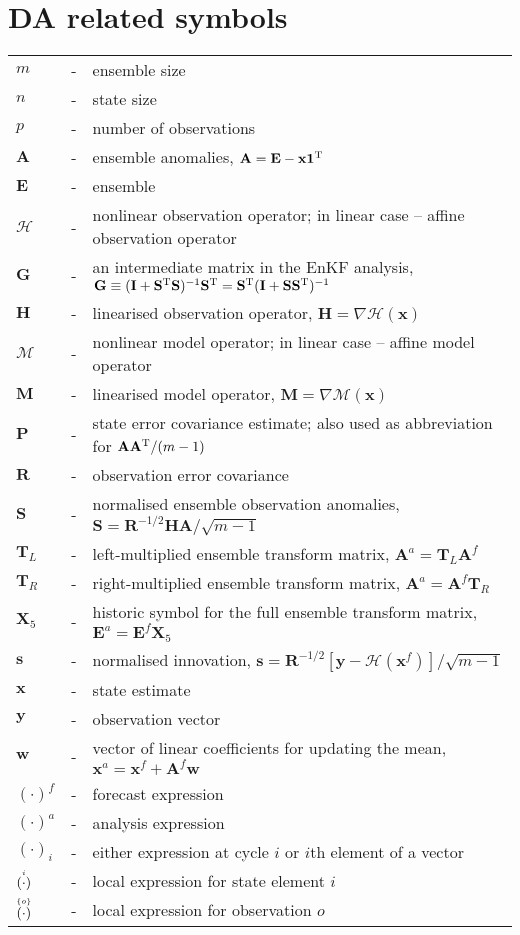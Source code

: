 \documentclass[11pt]{report}
\newcommand{\mb} {\mathbf}
\newcommand{\T}{^{\tiny \mathrm T}}
\newcommand{\ac}{\accentset}
\begin{document}
\section*{DA related symbols}
\begin{tabular}{lll}
  $m$ &-& ensemble size \\
  $n$ &-& state size \\
  $p$ &-& number of observations \\
  $\mb A$ &-& ensemble anomalies, $\mb A = \mb E - \mb x \mb 1\T$ \\
  $\mb E$ &-& ensemble \\
  $\mathcal H$ &-& nonlinear observation operator; in linear case -- affine observation operator \\
  $\mb G$ &-& an intermediate matrix in the EnKF analysis, $\mb G \equiv (\mb I + \mb S\T \mb S)^{-1} \mb S\T = \mb S\T ( \mb I + \mb S \mb S\T)^{-1}$ \\
  $\mb H$ &-& linearised observation operator, $\mb H = \nabla \mathcal H(\mb x)$ \\
  $\mathcal M$ &-& nonlinear model operator; in linear case -- affine model operator \\
  $\mb M$ &-& linearised model operator, $\mb M = \nabla \mathcal M(\mb x)$ \\
  $\mb P$ &-& state error covariance estimate; also used as abbreviation for $\mb A \mb A\T / (m - 1)$ \\
  $\mb R$ &-& observation error covariance \\
  $\mb S$ &-& normalised ensemble observation anomalies, $\mb S = \mb R^{-1/2} \mb {HA} / \sqrt{m - 1}$ \\
  $\mb T_L$ &-& left-multiplied ensemble transform matrix, $\mb A^a = \mb T_L \mb A^f$ \\
  $\mb T_R$ &-& right-multiplied ensemble transform matrix, $\mb A^a = \mb A^f \mb T_R$ \\
  $\mb X_5$ &-& historic symbol for the full ensemble transform matrix, $\mb E^a = \mb E^f \mb X_5$ \\ 
  $\mb s$ &-& normalised innovation, $\mb s = \mb R^{-1/2} \left[ \mb y - \mathcal H (\mb x^f) \right] / \sqrt{m - 1}$ \\
  $\mb x$ &-& state estimate \\
  $\mb y$ &-& observation vector \\
  $\mb w$ &-& vector of linear coefficients for updating the mean, $\mb x^a = \mb x^f + \mb A^f \mb w$ \\
  $(\cdot)^f$ &-& forecast expression \\
  $(\cdot)^a$ &-& analysis expression \\
  $(\cdot)_i$ &-& either expression at cycle $i$ or $i$th element of a vector \\
  $\ac{i}{(\cdot)}$ &-& local expression for state element $i$ \\
  $\ac{\{o\}}{(\cdot)}$ &-& local expression for observation $o$
\end{tabular}
\end{document}
